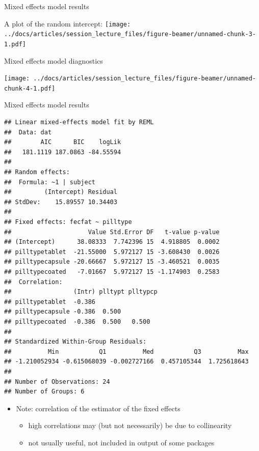 \documentclass[
  ignorenonframetext,
]{beamer}
\providecommand{\tightlist}{%
  \setlength{\itemsep}{0pt}\setlength{\parskip}{0pt}}
\begin{document}
\begin{frame}{Mixed effects model results}
\protect\hypertarget{mixed-effects-model-results}{}

A plot of the random intercept:
\texttt{[image: ../docs/articles/session\_lecture\_files/figure-beamer/unnamed-chunk-3-1.pdf]}

\end{frame}

\begin{frame}{Mixed effects model diagnostics}
\protect\hypertarget{mixed-effects-model-diagnostics}{}

\texttt{[image: ../docs/articles/session\_lecture\_files/figure-beamer/unnamed-chunk-4-1.pdf]}

\end{frame}

\begin{frame}[fragile]{Mixed effects model results}
\protect\hypertarget{mixed-effects-model-results-1}{}

\tiny

\begin{verbatim}
## Linear mixed-effects model fit by REML
##  Data: dat 
##        AIC      BIC    logLik
##   181.1119 187.0863 -84.55594
## 
## Random effects:
##  Formula: ~1 | subject
##         (Intercept) Residual
## StdDev:    15.89557 10.34403
## 
## Fixed effects: fecfat ~ pilltype 
##                     Value Std.Error DF   t-value p-value
## (Intercept)      38.08333  7.742396 15  4.918805  0.0002
## pilltypetablet  -21.55000  5.972127 15 -3.608430  0.0026
## pilltypecapsule -20.66667  5.972127 15 -3.460521  0.0035
## pilltypecoated   -7.01667  5.972127 15 -1.174903  0.2583
##  Correlation: 
##                 (Intr) plltypt plltypcp
## pilltypetablet  -0.386                 
## pilltypecapsule -0.386  0.500          
## pilltypecoated  -0.386  0.500   0.500  
## 
## Standardized Within-Group Residuals:
##          Min           Q1          Med           Q3          Max 
## -1.210052934 -0.615068039 -0.002727166  0.457105344  1.725618643 
## 
## Number of Observations: 24
## Number of Groups: 6
\end{verbatim}

\normalsize

\begin{itemize}
\tightlist
\item
  Note: correlation of the estimator of the fixed effects

  \begin{itemize}
  \tightlist
  \item
    high correlations may (but not necessarily) be due to collinearity
  \item
    not usually useful, not included in output of some packages
  \end{itemize}
\end{itemize}

\end{frame}
\end{document}
